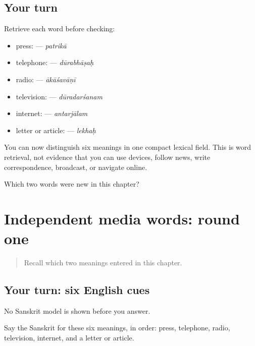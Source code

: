 \subsection*{Your turn}
Retrieve each word before checking:

\begin{itemize}
\raggedright
  \item press: \textbf{} — \emph{patrikā}
  \item telephone: \textbf{} — \emph{dūrabhāṣaḥ}
  \item radio: \textbf{} — \emph{ākāśavāṇī}
  \item television: \textbf{} — \emph{dūradarśanam}
  \item internet: \textbf{} — \emph{antarjālam}
  \item letter or article: \textbf{} — \emph{lekhaḥ}
\end{itemize}

\begin{grammarlens}[title={What you've built}]
You can now distinguish six meanings in one compact lexical field. This is word retrieval, not evidence that you can use devices, follow news, write correspondence, broadcast, or navigate online.
\end{grammarlens}

\begin{tcolorbox}[breakable,colback=teal!4,colframe=teal!35!black,title={Before you move on}]
Which two words were new in this chapter?
\end{tcolorbox}
\section[(independent media retrieval, first …]{Independent media words: round one}

\label{lesson:SA-C269-media-first-retrieval}



\begin{quote}
Recall which two meanings entered in this chapter.
\end{quote}

\subsection*{Your turn: six English cues}
No Sanskrit model is shown before you answer.

Say the Sanskrit for these six meanings, in order: press, telephone, radio, television, internet, and a letter or article.


